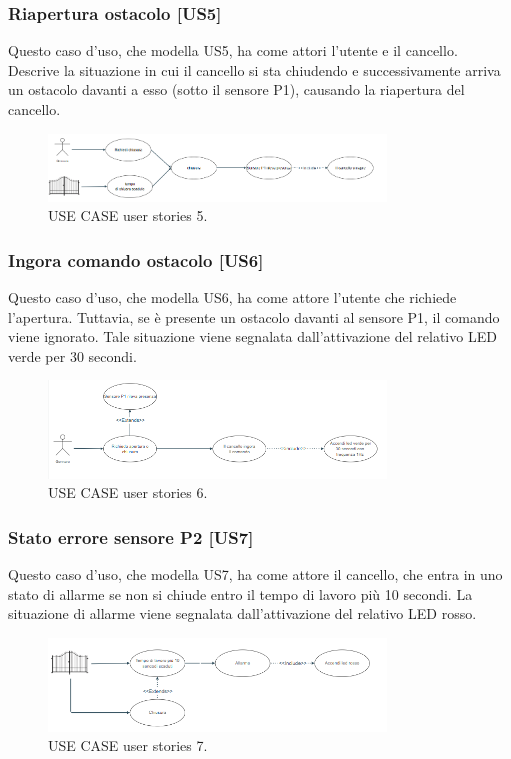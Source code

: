 \documentclass[12pt]{article}
\begin{document}
\subsubsection{Riapertura ostacolo [US5]}
Questo caso d'uso, che modella US5, ha come attori l'utente e il cancello. Descrive la situazione in cui il cancello si sta chiudendo e successivamente arriva un ostacolo davanti a esso (sotto il sensore P1), causando la riapertura del cancello.
    \begin{figure}[h]
        \centering
        \includegraphics[width=0.8\textwidth]{use_case_us5.PNG}
        \caption{USE CASE user stories 5.}
        \label{fig:use_case_us5}
    \end{figure}
\newpage
\subsubsection{Ingora comando ostacolo [US6]}
Questo caso d'uso, che modella US6, ha come attore l'utente che richiede l'apertura. Tuttavia, se è presente un ostacolo davanti al sensore P1, il comando viene ignorato. Tale situazione viene segnalata dall'attivazione del relativo LED verde per 30 secondi.
    \begin{figure}[h]
        \centering
        \includegraphics[width=0.8\textwidth]{use_case_us6.PNG}
        \caption{USE CASE user stories 6.}
        \label{fig:use_case_us6}
    \end{figure}

\subsubsection{Stato errore sensore P2 [US7]}
Questo caso d'uso, che modella US7, ha come attore il cancello, che entra in uno stato di allarme se non si chiude entro il tempo di lavoro più 10 secondi. La situazione di allarme viene segnalata dall'attivazione del relativo LED rosso.
    \begin{figure}[h]
        \centering
        \includegraphics[width=0.8\textwidth]{use_case_us7.PNG}
        \caption{USE CASE user stories 7.}
        \label{fig:use_case_us7}
    \end{figure}
\end{document}
